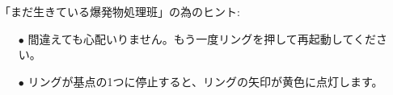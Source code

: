 \egroup

「まだ生きている爆発物処理班」の為のヒント:
\begin{itemize}
    \item[$\bullet$] 間違えても心配いりません。もう一度リングを押して再起動してください。
    \item[$\bullet$] リングが基点の1つに停止すると、リングの矢印が黄色に点灯します。
\end{itemize}
